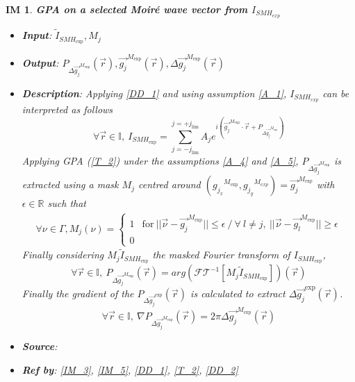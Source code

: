 \documentclass[12pt]{article}
\newtheorem{IM}{IM}
\begin{document}
\begin{IM}
\label{IM_2}
\noindent\colorbox{shadecolorIM}{\normalfont \textbf{GPA on a selected Moir{\'e} wave vector from $I_{SMH_{exp}}$}}
\normalfont
\begin{itemize}
\item \textbf{Input}: $\widetilde{I}_{\mathit{SMH}_{\text{exp}}}, M_j$
\item \textbf{Output}: $P_{\Delta \overrightarrow{g_{j}}^{M_{\text{exp}}}}(\vec{r}), \overrightarrow{g_{j}}^{M_{\text{exp}}}(\vec{r}), \Delta \overrightarrow{g_{j}}^{M_{\text{exp}}}(\vec{r})$
\item \textbf{Description}: Applying \cref{DD_1} and using assumption \cref{A_1}, $I_{SMH_{exp}}$ can be interpreted as follows
\begin{equation}
\forall \vec{r} \in \mathbb{I},\ I_{\mathit{SMH}_{\text{exp}}}=\sum_{j=-j_{\text{lim}}}^{j=+j_{\text{lim}}}A_je^{i(\overrightarrow{g_{j}}^{M_{\text{exp}}}\cdot\vec{r}+P_{\Delta \overrightarrow{g_{j}}^{M_{\text{exp}}}})}
\end{equation}
Applying GPA (\cref{T_2}) under the assumptions \cref{A_4} and \cref{A_5}, $P_{\Delta \overrightarrow{g_{j}}^{M_{\text{exp}}}}$ is extracted using a mask $M_j$ centred around $({g_{j_x}}^{M_{\text{exp}}},{g_{j_y}}^{M_{exp}})=\overrightarrow{g_{j}}^{M_{\text{exp}}}$ with $\epsilon \in \mathbb{R}$ such that
\begin{equation}
\begin{gathered}
\forall \nu \in \Gamma, M_j(\nu) = 
\begin{cases}
1 & \text{for} \ ||\vec{\nu}-\overrightarrow{g_{j}}^{M_{\text{exp}}}||\leq\epsilon \ / \ \forall \ l\neq j, \ ||\vec{\nu}-\overrightarrow{g_{l}}^{M_{\text{exp}}}||\geq \epsilon \\
0
\end{cases}
\end{gathered}
\end{equation}
Finally considering $M_j\widetilde{I}_{\mathit{SMH}_{\text{exp}}}$ the masked Fourier transform of $I_{\mathit{SMH}_{\text{exp}}}$,
\begin{equation}
\forall \vec{r} \in \mathbb{I},\ P_{\Delta \overrightarrow{g_{j}}^{M_{\text{exp}}}}(\vec{r})=arg(\mathcal{FT}^{-1}[M_j\widetilde{I}_{\mathit{SMH}_{\text{exp}}}])(\vec{r})
\end{equation}
Finally the gradient of the $P_{\Delta \overrightarrow{g_{j}}^{\text{exp}}}(\vec{r})$ is calculated to extract ${\Delta \overrightarrow{g_{j}}^{\text{exp}}}(\vec{r})$.
\begin{equation}
\forall \vec{r} \in \mathbb{I},\ \nabla P_{\Delta \overrightarrow{g_{j}}^{M_{\text{exp}}}}(\vec{r})=2\pi\Delta \overrightarrow{g_{j}}^{M_{\text{exp}}}(\vec{r})
\end{equation}
\item \textbf{Source}: \cite{Hytch1998}
\item \textbf{Ref by}: \cref{IM_3}, \cref{IM_5}, \cref{DD_1}, \cref{T_2}, \cref{DD_2}
\end{itemize}
\end{IM}
\end{document}
